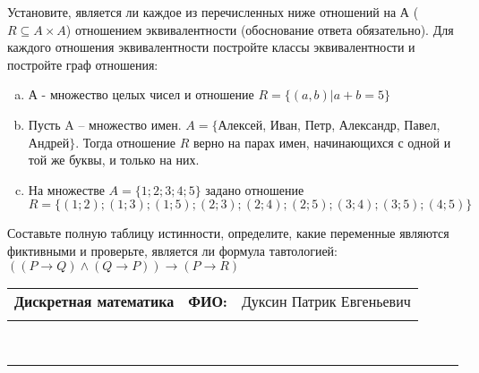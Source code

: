 \documentclass[10pt]{exam}
\newcommand{\class}{Дискретная математика}
\newcommand{\examdate}{}
\begin{document}
\begin{questions}
\question
Установите, является ли каждое из перечисленных ниже отношений на А ($R \subseteq A \times A$) отношением эквивалентности (обоснование ответа обязательно). Для каждого отношения эквивалентности постройте классы 
эквивалентности и постройте граф отношения:
\begin{enumerate} [a)]\setcounter{enumi}{0}
\item А - множество целых чисел и отношение $R = \{(a,b)|a + b = 5\}$
\item Пусть A – множество имен. $A = \{ $Алексей, Иван, Петр, Александр, Павел, Андрей$ \}$. Тогда отношение $R $ верно на парах имен, начинающихся с одной и той же буквы, и только на них.
\item На множестве $A = \{1; 2; 3; 4; 5\}$ задано отношение $R = \{(1; 2); (1; 3); (1; 5); (2; 3); (2; 4); (2; 5); (3; 4); (3; 5); (4; 5)\}$
\end{enumerate}\question Составьте полную таблицу истинности, определите, какие переменные являются фиктивными и проверьте, является ли формула тавтологией:
$(( P \rightarrow Q) \land (Q \rightarrow P)) \rightarrow (P \rightarrow R)$

\end{questions}
\newpage
\begin{flushright}
\begin{tabular}{p{2.8in} r l}
\textbf{\class} & \textbf{ФИО:} &Дуксин Патрик Евгеньевич
\\

\textbf{\examdate} &&\\
\end{tabular}\\
\end{flushright}
\rule[1ex]{\textwidth}{.1pt}
\end{document}
